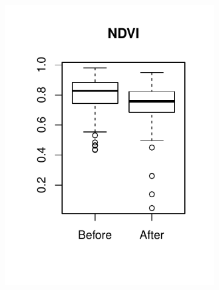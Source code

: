 \documentclass[a4paper,12pt]{scrbook}
\begin{document}
\begin{figure}
  \centering
  \begin{subfigure}[b]{0.32\textwidth}
    \includegraphics[width=\textwidth]{thesis-figures/03-boxplot-ndvi}
  \end{subfigure}
  \begin{subfigure}[b]{0.32\textwidth}

\end{subfigure}
\end{figure}
\end{document}
